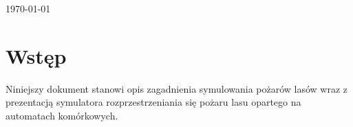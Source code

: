 \documentclass[a4paper, 11pt]{article}
\begin{document}
\begin{titlepage}
		
		
		{\large \today}\\[3cm] %
		
		
		
		
		\vfill %
		
	\end{titlepage}
	
	
	\tableofcontents
	\vfill
	\newpage
	
	
	
	\section{Wstęp}
	\indent
	
	Niniejszy dokument stanowi opis zagadnienia symulowania pożarów lasów wraz z prezentacją symulatora rozprzestrzeniania się pożaru lasu opartego na automatach komórkowych.

\end{document}
